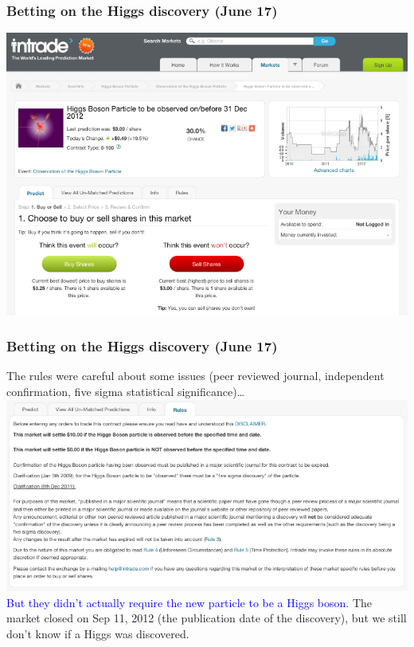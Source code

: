 \documentclass[compress]{beamer}
\begin{document}
\begin{frame}
\frametitle{Betting on the Higgs discovery (June 17)}
\vfill
\includegraphics[width=\linewidth]{higgs_trading.png}
\end{frame}

\begin{frame}
\frametitle{Betting on the Higgs discovery (June 17)}
\vfill
The rules were careful about some issues (peer reviewed journal, independent confirmation, five sigma statistical significance)\ldots
\vfill
\includegraphics[width=\linewidth]{doesnt_mention_spin.png}
\vfill
\textcolor{blue}{But they didn't actually require the new particle to be a Higgs boson.}
\vfill
The market closed on Sep 11, 2012 (the publication date of the discovery), but we still don't know if a Higgs was discovered.
\end{frame}
\end{document}
